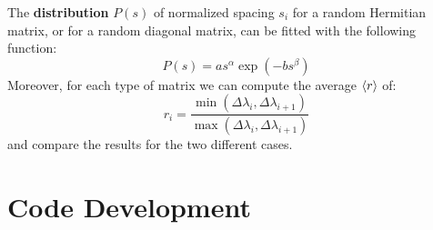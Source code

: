 \documentclass[rmp,10pt,onecolumn,fleqn,notitlepage]{revtex4-1}
\begin{document}
The \textbf{distribution} \( P(s) \) of normalized spacing \( s_i \) for a random Hermitian matrix, or for a random diagonal matrix, can be fitted with the following function:
\begin{equation}
  P(s) = a s^{\alpha } \exp(- b s^{\beta })
  \label{eq:distribution}
\end{equation}
Moreover, for each type of matrix we can compute the average \( \expval{r}  \) of:
\begin{equation}
  r_i = \frac{\min(\Delta \lambda _i, \Delta \lambda _{i+1})}{\max( \Delta \lambda _i, \Delta \lambda _{i+1})}
  \label{eq:ri}
\end{equation}
and compare the results for the two different cases.
%

\section{Code Development}
\end{document}
